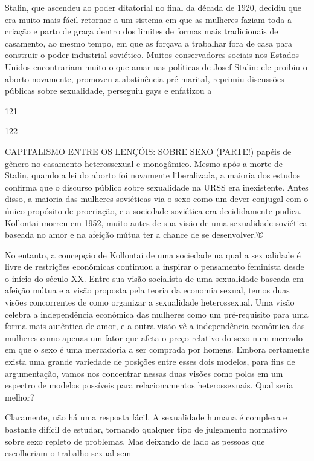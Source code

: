  \par 
Stalin, que ascendeu ao poder ditatorial no final da década de 1920, decidiu que era muito mais fácil retornar a um sistema em que as mulheres faziam toda a criação e parto de graça dentro dos limites de formas mais tradicionais de casamento, ao mesmo tempo, em que as forçava a trabalhar fora de casa para construir o poder industrial soviético. Muitos conservadores sociais nos Estados Unidos encontrariam muito o que amar nas políticas de Josef Stalin: ele proibiu o aborto novamente, promoveu a abstinência pré-marital, reprimiu discussões públicas sobre sexualidade, perseguiu gays e enfatizou a
 \par 
121
 \par 
122
 \par 
CAPITALISMO ENTRE OS LENÇÓIS: SOBRE SEXO (PARTE!) papéis de gênero no casamento heterossexual e monogâmico. Mesmo após a morte de Stalin, quando a lei do aborto foi novamente liberalizada, a maioria dos estudos confirma que o discurso público sobre sexualidade na URSS era inexistente. Antes disso, a maioria das mulheres soviéticas via o sexo como um dever conjugal com o único propósito de procriação, e a sociedade soviética era decididamente pudica. Kollontai morreu em 1952, muito antes de sua visão de uma sexualidade soviética baseada no amor e na afeição mútua ter a chance de se desenvolver.'®
 \par 
No entanto, a concepção de Kollontai de uma sociedade na qual a sexualidade é livre de restrições econômicas continuou a inspirar o pensamento feminista desde o início do século XX. Entre sua visão socialista de uma sexualidade baseada em afeição mútua e a visão proposta pela teoria da economia sexual, temos duas visões concorrentes de como organizar a sexualidade heterossexual. Uma visão celebra a independência econômica das mulheres como um pré-requisito para uma forma mais autêntica de amor, e a outra visão vê a independência econômica das mulheres como apenas um fator que afeta o preço relativo do sexo num mercado em que o sexo é uma mercadoria a ser comprada por homens. Embora certamente exista uma grande variedade de posições entre esses dois modelos, para fins de argumentação, vamos nos concentrar nessas duas visões como polos em um espectro de modelos possíveis para relacionamentos heterossexuais. Qual seria melhor?
 \par 
Claramente, não há uma resposta fácil. A sexualidade humana é complexa e bastante difícil de estudar, tornando qualquer tipo de julgamento normativo sobre sexo repleto de problemas. Mas deixando de lado as pessoas que escolheriam o trabalho sexual sem
